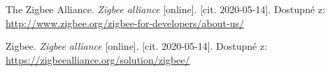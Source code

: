 \begin{thebibliography}{9}






%  









The Zigbee Alliance.
\textit{
    Zigbee alliance
}
[online]. [cit. 2020-05-14]. Dostupné z: 
\url{
http://www.zigbee.org/zigbee-for-developers/about-us/
}



Zigbee.
\textit{
Zigbee alliance
}
[online]. [cit. 2020-05-14]. Dostupné z: 
\url{
https://zigbeealliance.org/solution/zigbee/
}


\end{thebibliography}
